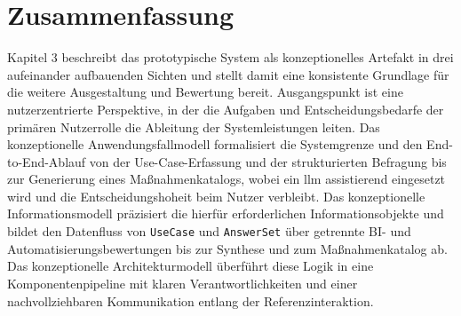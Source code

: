\section*{Zusammenfassung}
Kapitel 3 beschreibt das prototypische System als konzeptionelles Artefakt in drei aufeinander aufbauenden Sichten und stellt damit eine konsistente Grundlage für die weitere Ausgestaltung und Bewertung bereit. Ausgangspunkt ist eine nutzerzentrierte Perspektive, in der die Aufgaben und Entscheidungsbedarfe der primären Nutzerrolle die Ableitung der Systemleistungen leiten. Das konzeptionelle Anwendungsfallmodell formalisiert die Systemgrenze und den End-to-End-Ablauf von der Use-Case-Erfassung und der strukturierten Befragung bis zur Generierung eines Maßnahmenkatalogs, wobei ein \gls{llm} assistierend eingesetzt wird und die Entscheidungshoheit beim Nutzer verbleibt. Das konzeptionelle Informationsmodell präzisiert die hierfür erforderlichen Informationsobjekte und bildet den Datenfluss von \texttt{UseCase} und \texttt{AnswerSet} über getrennte BI- und Automatisierungsbewertungen bis zur Synthese und zum Maßnahmenkatalog ab. Das konzeptionelle Architekturmodell überführt diese Logik in eine Komponentenpipeline mit klaren Verantwortlichkeiten und einer nachvollziehbaren Kommunikation entlang der Referenzinteraktion.